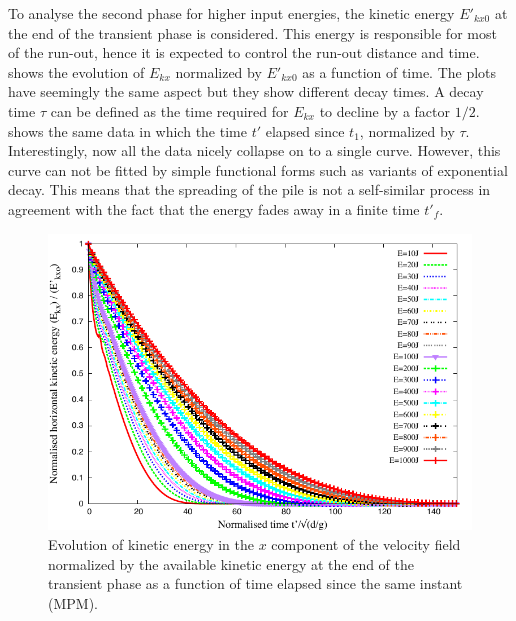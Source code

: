 To analyse the second phase for higher input energies, the 
kinetic energy $E'_{kx0}$ at the end of the transient phase is 
considered. This energy is responsible for most of the run-out, hence it is 
expected to 
control the run-out distance and time.~ 
shows the evolution of $E_{kx}$ normalized by $E'_{kx0}$ as a function of time. 
The plots have seemingly the same aspect but they show different decay times. A 
decay time $\tau$ can be defined as the time required for $E_{kx}$ to decline 
by a factor $1/2$.~ shows the same data in 
which the time $t'$ elapsed since $t_1$, normalized by $\tau$. Interestingly, 
now all the data nicely collapse on to a single curve. However, this curve can 
not be fitted by simple functional forms such as variants of exponential decay. 
This means that the spreading of the pile is not a self-similar process in 
agreement with the fact that the energy fades away in a finite time $t'_f$. 

\clearpage

\begin{figure}[tbhp]
\centering
\includegraphics[width=\textwidth]{Normalised_KExExop_Slope}
\caption[Evolution of the normalised horizontal kinetic energy as function of 
time since the transient phase.]{Evolution of kinetic energy in the $x$ 
component of the velocity field normalized by the available kinetic energy at 
the
end of the transient phase as a function of time elapsed since the
same instant (MPM).}
\label{fig:Normalised_KExExop_Slope}
\end{figure}

